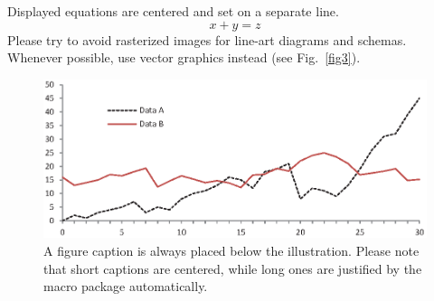 \documentclass[runningheads]{llncs}
\begin{document}
\noindent Displayed equations are centered and set on a separate
line.
\begin{equation}
x + y = z
\end{equation}
Please try to avoid rasterized images for line-art diagrams and
schemas. Whenever possible, use vector graphics instead (see
Fig.~\ref{fig3}).

\begin{figure}
\includegraphics[width=\textwidth]{fig1.eps}
\caption{A figure caption is always placed below the illustration.
Please note that short captions are centered, while long ones are
justified by the macro package automatically.} \label{fig1}
\end{figure}
\end{document}
